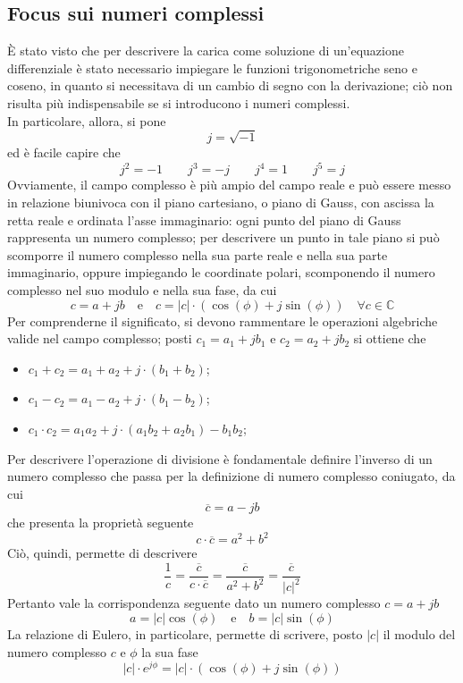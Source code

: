 \documentclass[a4paper]{extarticle}
\begin{document}
\subsection{Focus sui numeri complessi}
È stato visto che per descrivere la carica come soluzione di un'equazione differenziale è stato necessario impiegare le funzioni trigonometriche seno e coseno, in quanto si necessitava di un cambio di segno con la derivazione; ciò non risulta più indispensabile se si introducono i numeri complessi.\\
In particolare, allora, si pone
\[j=\sqrt{-1}\]
ed è facile capire che
\[j^2=-1 \hspace{2em} j^3=-j \hspace{2em} j^4=1 \hspace{2em} j^5=j\]
Ovviamente, il campo complesso è più ampio del campo reale e può essere messo in relazione biunivoca con il piano cartesiano, o piano di Gauss, con ascissa la retta reale e ordinata l'asse immaginario: ogni punto del piano di Gauss rappresenta un numero complesso; per descrivere un punto in tale piano si può scomporre il numero complesso nella sua parte reale e nella sua parte immaginario, oppure impiegando le coordinate polari, scomponendo il numero complesso nel suo modulo e nella sua fase, da cui
\[c=a+j b \hspace{1em} \text{e} \hspace{1em} c=\vert c \vert \cdot \left(\cos(\phi) + j\sin(\phi)\right) \hspace{1em} \forall c \in \mathbb{C}\]
Per comprenderne il significato, si devono rammentare le operazioni algebriche valide nel campo complesso; posti $c_1=a_1+j b_1$ e $c_2=a_2+j b_2$ si ottiene che
\begin{itemize}
  \item $c_1+c_2=a_1+a_2+j \cdot (b_1+b_2)$;
  \item $c_1-c_2=a_1-a_2+j \cdot (b_1-b_2)$;
  \item $c_1\cdot c_2=a_1a_2 + j \cdot (a_1b_2 + a_2b_1) - b_1b_2$;
\end{itemize}
Per descrivere l'operazione di divisione è fondamentale definire l'inverso di un numero complesso che passa per la definizione di numero complesso coniugato, da cui
\[\overline{c}=a-jb\]
che presenta la proprietà seguente
\[c \cdot \overline{c} = a^2 + b^2\]
Ciò, quindi, permette di descrivere
\[\dfrac{1}{c}=\dfrac{\overline{c}}{c \cdot \overline{c}} = \dfrac{\overline{c}}{a^2+b^2}=\dfrac{\overline{c}}{\vert c \vert^2}\]
Pertanto vale la corrispondenza seguente dato un numero complesso $c=a+jb$
\[a=\vert c \vert \cos(\phi) \hspace{1em} \text{e} \hspace{1em} b=\vert c \vert \sin(\phi)\]
La relazione di Eulero, in particolare, permette di scrivere, posto $\vert c \vert$ il modulo del numero complesso $c$ e $\phi$ la sua fase
\[\vert c \vert \cdot e^{j \phi} = \vert c \vert \cdot \left( \cos(\phi) + j \sin(\phi) \right)\]
\end{document}
